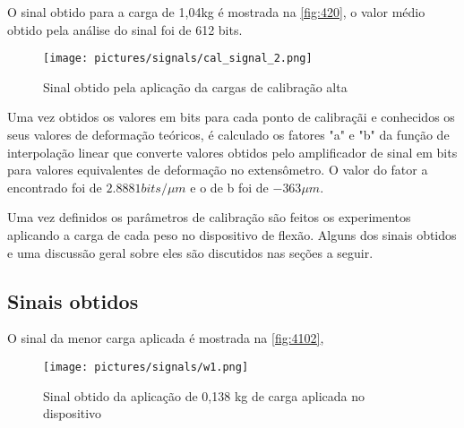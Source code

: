 O sinal obtido para a carga de 1,04kg é mostrada na \autoref{fig:420}, o valor médio obtido pela análise do sinal foi de 612 bits.

\begin{figure}[htb]
	\caption{\label{fig:420} Sinal obtido pela aplicação da cargas de calibração alta}
	\begin{center}
		\texttt{[image: pictures/signals/cal\_signal\_2.png]}
	\end{center}
\end{figure}

Uma vez obtidos os valores em bits para cada ponto de calibraçãi e conhecidos os seus valores de deformação teóricos, é calculado os fatores "a" e "b" da função de interpolação
linear que converte valores obtidos pelo amplificador de sinal em bits para valores equivalentes de deformação no extensômetro.
O valor do fator a encontrado foi de $2.8881 bits/{\mu}m$ e o de b foi de $-363{\mu}m$.

Uma vez definidos os parâmetros de calibração são feitos os experimentos aplicando a carga de cada peso no dispositivo de flexão.
Alguns dos sinais obtidos e uma discussão geral sobre eles são discutidos nas seções a seguir.

\subsection{Sinais obtidos}

O sinal da menor carga aplicada é mostrada na \autoref{fig:4102},

\begin{figure}[H]
	\caption{\label{fig:4102} Sinal obtido da aplicação de 0,138 kg de carga aplicada no dispositivo}
	\begin{center}
		\texttt{[image: pictures/signals/w1.png]}
	\end{center}
\end{figure}


